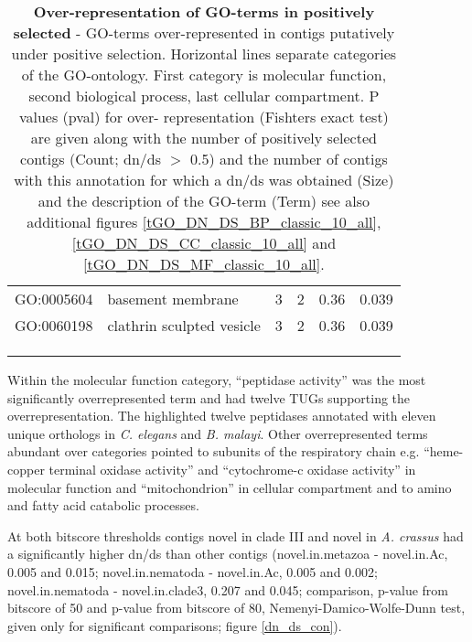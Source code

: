 \begin{longtable}{lp{4.5cm}rrrl}
  GO:0005604 & basement membrane &   3 &   2 & 0.36 & 0.039 \\ 
  GO:0060198 & clathrin sculpted vesicle &   3 &   2 & 0.36 & 0.039 \\ 
\hline\\
\caption[Over-representation of GO-terms in positively
selected]{\textbf{Over-representation of GO-terms in positively
    selected} - GO-terms over-represented in contigs putatively under
  positive selection. Horizontal lines separate categories of the
  GO-ontology. First category is molecular function, second biological
  process, last cellular compartment. P values (pval) for over-
  representation (Fishters exact test) are given along with the number
  of positively selected contigs (Count; dn/ds $>$ 0.5) and the number
  of contigs with this annotation for which a dn/ds was obtained
  (Size) and the description of the GO-term (Term) see also additional
  figures \ref{tGO_DN_DS_BP_classic_10_all},
  \ref{tGO_DN_DS_CC_classic_10_all} and
  \ref{tGO_DN_DS_MF_classic_10_all}.}\\
\label{go-pos}
\end{longtable}

Within the molecular function category, ``peptidase activity'' was the
most significantly overrepresented term and had twelve TUGs supporting the
overrepresentation. The highlighted twelve peptidases annotated with
eleven unique orthologs in \textit{C. elegans} and \textit{B. malayi}.
Other overrepresented terms abundant over categories pointed to
subunits of the respiratory chain e.g. ``heme-copper terminal oxidase
activity'' and ``cytochrome-c oxidase activity'' in molecular function
and ``mitochondrion'' in cellular compartment and to amino and fatty
acid catabolic processes.

At both bitscore thresholds contigs novel in clade III and novel in
\textit{A. crassus} had a significantly higher dn/ds than other
contigs (novel.in.metazoa - novel.in.Ac, 0.005 and 0.015;
novel.in.nematoda - novel.in.Ac, 0.005 and 0.002; novel.in.nematoda -
novel.in.clade3, 0.207 and 0.045; comparison, p-value from bitscore of
50 and p-value from bitscore of 80, Nemenyi-Damico-Wolfe-Dunn test,
given only for significant comparisons; figure \ref{dn_ds_con}).


